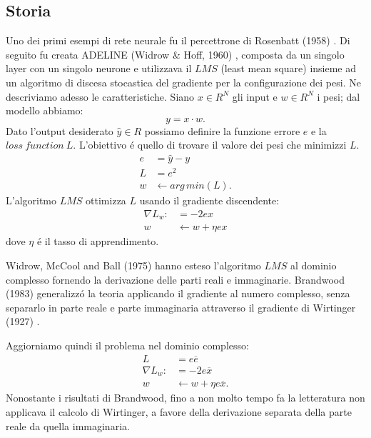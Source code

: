 \documentclass[a4paper,10pt]{article}
\begin{document}
 \subsection{Storia}
 Uno dei primi esempi di rete neurale fu il percettrone di Rosenbatt (1958) \cite{rosenblatt1958perceptron}. Di seguito fu creata ADELINE (Widrow \& Hoff, 1960) \cite{widrow1962generalization}, composta da un singolo layer con un singolo neurone e utilizzava il $LMS$ (least mean square) insieme ad un algoritmo di discesa stocastica del gradiente per la configurazione dei pesi. Ne descriviamo adesso le caratteristiche. Siano $x \in R^N$ gli input e $w \in R^N$ i pesi; dal modello abbiamo:
 \begin{equation}
  y = x \cdot w.
 \end{equation}
 Dato l'output desiderato $\widehat{y} \in R$ possiamo definire la funzione errore $e$ e la $loss \ function \ L$. L'obiettivo \'e quello di trovare il valore dei pesi che minimizzi $L$.
 \begin{align}
  e &= \widehat{y} - y\\
  L &= e^2\\
  w &\leftarrow arg \, min(L).
 \end{align}
 L'algoritmo $LMS$ ottimizza $L$ usando il gradiente discendente:
 \begin{align}
  \nabla L_w: &= -2ex\\
  w &\leftarrow w + \eta ex
 \end{align}
 dove $\eta$ \'e il tasso di apprendimento. 

 Widrow, McCool and Ball (1975) \cite{widrow1975complex} hanno esteso l'algoritmo $LMS$ al dominio complesso fornendo la derivazione delle parti reali e immaginarie. Brandwood (1983) \cite{brandwood1983complex} generalizz\'o la teoria applicando il gradiente al numero complesso, senza separarlo in parte reale e parte immaginaria attraverso il gradiente di Wirtinger (1927) \cite{wirtinger1927formalen}. 

 Aggiorniamo quindi il problema nel dominio complesso:
 \begin{align}
  L &= e \overline{e}\\
  \nabla L_w : &= -2e\overline{x}\\
  w &\leftarrow w + \eta e \overline{x}.
 \end{align}
 Nonostante i risultati di Brandwood, fino a non molto tempo fa la letteratura non applicava il calcolo di Wirtinger, a favore della derivazione separata della parte reale da quella immaginaria. 
 
\end{document}
